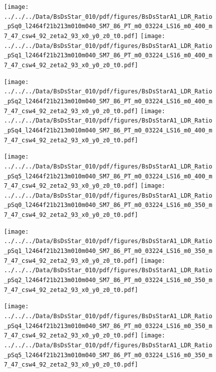 \documentclass[a4paper,10pt]{article}
\begin{document}
\begin{figure}[p]
 \texttt{[image: ../../../Data/BsDsStar\_010/pdf/figures/BsDsStarA1\_LDR\_Ratio\_pSq0\_l2464f21b213m010m040\_SM7\_86\_PT\_m0\_03224\_LS16\_m0\_400\_m7\_47\_csw4\_92\_zeta2\_93\_x0\_y0\_z0\_t0.pdf]} 
 \texttt{[image: ../../../Data/BsDsStar\_010/pdf/figures/BsDsStarA1\_LDR\_Ratio\_pSq1\_l2464f21b213m010m040\_SM7\_86\_PT\_m0\_03224\_LS16\_m0\_400\_m7\_47\_csw4\_92\_zeta2\_93\_x0\_y0\_z0\_t0.pdf]} 
 \end{figure}
\begin{figure}[p]
 \texttt{[image: ../../../Data/BsDsStar\_010/pdf/figures/BsDsStarA1\_LDR\_Ratio\_pSq2\_l2464f21b213m010m040\_SM7\_86\_PT\_m0\_03224\_LS16\_m0\_400\_m7\_47\_csw4\_92\_zeta2\_93\_x0\_y0\_z0\_t0.pdf]} 
 \texttt{[image: ../../../Data/BsDsStar\_010/pdf/figures/BsDsStarA1\_LDR\_Ratio\_pSq4\_l2464f21b213m010m040\_SM7\_86\_PT\_m0\_03224\_LS16\_m0\_400\_m7\_47\_csw4\_92\_zeta2\_93\_x0\_y0\_z0\_t0.pdf]} 
 \end{figure}
\begin{figure}[p]
 \texttt{[image: ../../../Data/BsDsStar\_010/pdf/figures/BsDsStarA1\_LDR\_Ratio\_pSq5\_l2464f21b213m010m040\_SM7\_86\_PT\_m0\_03224\_LS16\_m0\_400\_m7\_47\_csw4\_92\_zeta2\_93\_x0\_y0\_z0\_t0.pdf]} 
 \texttt{[image: ../../../Data/BsDsStar\_010/pdf/figures/BsDsStarA1\_LDR\_Ratio\_pSq0\_l2464f21b213m010m040\_SM7\_86\_PT\_m0\_03224\_LS16\_m0\_350\_m7\_47\_csw4\_92\_zeta2\_93\_x0\_y0\_z0\_t0.pdf]} 
 \end{figure}
\clearpage
\begin{figure}[p]
 \texttt{[image: ../../../Data/BsDsStar\_010/pdf/figures/BsDsStarA1\_LDR\_Ratio\_pSq1\_l2464f21b213m010m040\_SM7\_86\_PT\_m0\_03224\_LS16\_m0\_350\_m7\_47\_csw4\_92\_zeta2\_93\_x0\_y0\_z0\_t0.pdf]} 
 \texttt{[image: ../../../Data/BsDsStar\_010/pdf/figures/BsDsStarA1\_LDR\_Ratio\_pSq2\_l2464f21b213m010m040\_SM7\_86\_PT\_m0\_03224\_LS16\_m0\_350\_m7\_47\_csw4\_92\_zeta2\_93\_x0\_y0\_z0\_t0.pdf]} 
 \end{figure}
\begin{figure}[p]
 \texttt{[image: ../../../Data/BsDsStar\_010/pdf/figures/BsDsStarA1\_LDR\_Ratio\_pSq4\_l2464f21b213m010m040\_SM7\_86\_PT\_m0\_03224\_LS16\_m0\_350\_m7\_47\_csw4\_92\_zeta2\_93\_x0\_y0\_z0\_t0.pdf]} 
 \texttt{[image: ../../../Data/BsDsStar\_010/pdf/figures/BsDsStarA1\_LDR\_Ratio\_pSq5\_l2464f21b213m010m040\_SM7\_86\_PT\_m0\_03224\_LS16\_m0\_350\_m7\_47\_csw4\_92\_zeta2\_93\_x0\_y0\_z0\_t0.pdf]} 
 \end{figure}
\end{document}
